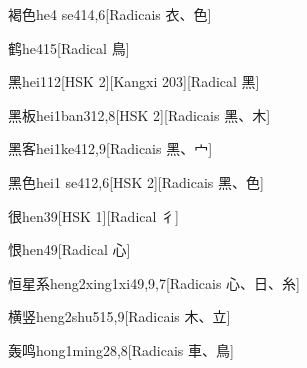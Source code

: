 \begin{entry}{褐色}{he4 se4}{14,6}[Radicais ⾐、⾊]
\end{entry}

\begin{entry}{鹤}{he4}{15}[Radical ⿃]
\end{entry}

\begin{entry}{黑}{hei1}{12}[HSK 2][Kangxi 203][Radical ⿊]
\end{entry}

\begin{entry}{黑板}{hei1ban3}{12,8}[HSK 2][Radicais ⿊、⽊]
\end{entry}

\begin{entry}{黑客}{hei1ke4}{12,9}[Radicais ⿊、⼧]
\end{entry}

\begin{entry}{黑色}{hei1 se4}{12,6}[HSK 2][Radicais ⿊、⾊]
\end{entry}

\begin{entry}{很}{hen3}{9}[HSK 1][Radical ⼻]
\end{entry}

\begin{entry}{恨}{hen4}{9}[Radical ⼼]
\end{entry}

\begin{entry}{恒星系}{heng2xing1xi4}{9,9,7}[Radicais ⼼、⽇、⽷]
\end{entry}

\begin{entry}{横竖}{heng2shu5}{15,9}[Radicais ⽊、⽴]
\end{entry}

\begin{entry}{轰鸣}{hong1ming2}{8,8}[Radicais ⾞、⿃]
\end{entry}

